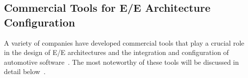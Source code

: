 \subsection{Commercial Tools for E/E Architecture Configuration}

A variety of companies have developed commercial tools that play a crucial role in the design of E/E architectures and the integration and configuration of automotive software~\cite{waszecki2013engineer}. The most noteworthy of these tools will be discussed in detail below~\cite{askaripoor2022architecture}.







